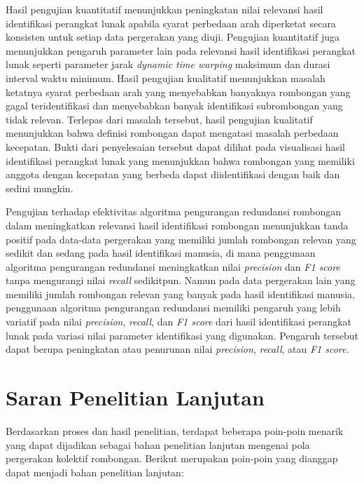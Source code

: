 Hasil pengujian kuantitatif menunjukkan peningkatan nilai relevansi hasil identifikasi perangkat lunak apabila syarat perbedaan arah diperketat secara konsisten untuk setiap data pergerakan yang diuji. Pengujian kuantitatif juga menunjukkan pengaruh parameter lain pada relevansi hasil identifikasi perangkat lunak seperti parameter jarak \textit{dynamic time warping} maksimum dan durasi interval waktu minimum. Hasil pengujian kualitatif menunjukkan masalah ketatnya syarat perbedaan arah yang menyebabkan banyaknya rombongan yang gagal teridentifikasi dan menyebabkan banyak identifikasi subrombongan yang tidak relevan. Terlepas dari masalah tersebut, hasil pengujian kualitatif menunjukkan bahwa definisi rombongan dapat mengatasi masalah perbedaan kecepatan. Bukti dari penyelesaian tersebut dapat dilihat pada visualisasi hasil identifikasi perangkat lunak yang menunjukkan bahwa rombongan yang memiliki anggota dengan kecepatan yang berbeda dapat diidentifikasi dengan baik dan sedini mungkin.

Pengujian terhadap efektivitas algoritma pengurangan redundansi rombongan dalam meningkatkan relevansi hasil identifikasi rombongan menunjukkan tanda positif pada data-data pergerakan yang memiliki jumlah rombongan relevan yang sedikit dan sedang pada hasil identifikasi manusia, di mana penggunaan algoritma pengurangan redundansi meningkatkan nilai \textit{precision} dan \textit{F1 score} tanpa mengurangi nilai \textit{recall} sedikitpun. Namun pada data pergerakan lain yang memiliki jumlah rombongan relevan yang banyak pada hasil identifikasi manusia, penggunaan algoritma pengurangan redundansi memiliki pengaruh yang lebih variatif pada nilai \textit{precision}, \textit{recall}, dan \textit{F1 score} dari hasil identifikasi perangkat lunak pada variasi nilai parameter identifikasi yang digunakan. Pengaruh tersebut dapat berupa peningkatan atau penurunan nilai \textit{precision}, \textit{recall}, atau \textit{F1 score}.

\section{Saran Penelitian Lanjutan}
\label{sec:saran}

Berdasarkan proses dan hasil penelitian, terdapat beberapa poin-poin menarik yang dapat dijadikan sebagai bahan penelitian lanjutan mengenai pola pergerakan kolektif rombongan. Berikut merupakan poin-poin yang dianggap dapat menjadi bahan penelitian lanjutan:

